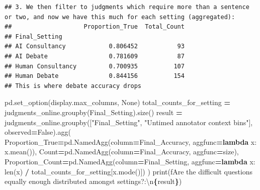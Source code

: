 \documentclass[
]{article}
\newenvironment{Shaded}{\begin{snugshade}}{\end{snugshade}}
\newcommand{\BuiltInTok}[1]{#1}
\newcommand{\CharTok}[1]{\textcolor[rgb]{0.31,0.60,0.02}{#1}}
\newcommand{\KeywordTok}[1]{\textcolor[rgb]{0.13,0.29,0.53}{\textbf{#1}}}
\newcommand{\NormalTok}[1]{#1}
\newcommand{\OperatorTok}[1]{\textcolor[rgb]{0.81,0.36,0.00}{\textbf{#1}}}
\newcommand{\SpecialCharTok}[1]{\textcolor[rgb]{0.81,0.36,0.00}{\textbf{#1}}}
\newcommand{\SpecialStringTok}[1]{\textcolor[rgb]{0.31,0.60,0.02}{#1}}
\newcommand{\StringTok}[1]{\textcolor[rgb]{0.31,0.60,0.02}{#1}}
\newcommand{\VariableTok}[1]{\textcolor[rgb]{0.00,0.00,0.00}{#1}}
\begin{document}
\begin{verbatim}
## 3. We then filter to judgments which require more than a sentence or two, and now we have this much for each setting (aggregated):
##                    Proportion_True  Total_Count
## Final_Setting                                  
## AI Consultancy            0.806452           93
## AI Debate                 0.781609           87
## Human Consultancy         0.700935          107
## Human Debate              0.844156          154
## This is where debate accuracy drops
\end{verbatim}

\begin{Shaded}
\begin{Highlighting}[]
\NormalTok{pd.set\_option(}\StringTok{\textquotesingle{}display.max\_columns\textquotesingle{}}\NormalTok{, }\VariableTok{None}\NormalTok{)}
\NormalTok{total\_counts\_for\_setting }\OperatorTok{=}\NormalTok{ judgments\_online.groupby(}\StringTok{\textquotesingle{}Final\_Setting\textquotesingle{}}\NormalTok{).size()}
\NormalTok{result }\OperatorTok{=}\NormalTok{ judgments\_online.groupby([}\StringTok{"Final\_Setting"}\NormalTok{, }\StringTok{"Untimed annotator context bins"}\NormalTok{], observed}\OperatorTok{=}\VariableTok{False}\NormalTok{).agg(}
\NormalTok{    Proportion\_True}\OperatorTok{=}\NormalTok{pd.NamedAgg(column}\OperatorTok{=}\StringTok{\textquotesingle{}Final\_Accuracy\textquotesingle{}}\NormalTok{, aggfunc}\OperatorTok{=}\KeywordTok{lambda}\NormalTok{ x: x.mean()),}
\NormalTok{    Count}\OperatorTok{=}\NormalTok{pd.NamedAgg(column}\OperatorTok{=}\StringTok{\textquotesingle{}Final\_Accuracy\textquotesingle{}}\NormalTok{, aggfunc}\OperatorTok{=}\StringTok{\textquotesingle{}size\textquotesingle{}}\NormalTok{),}
\NormalTok{    Proportion\_Count}\OperatorTok{=}\NormalTok{pd.NamedAgg(column}\OperatorTok{=}\StringTok{\textquotesingle{}Final\_Setting\textquotesingle{}}\NormalTok{, aggfunc}\OperatorTok{=}\KeywordTok{lambda}\NormalTok{ x: }\BuiltInTok{len}\NormalTok{(x) }\OperatorTok{/}\NormalTok{ total\_counts\_for\_setting[x.mode()])}
\NormalTok{)}
\BuiltInTok{print}\NormalTok{(}\SpecialStringTok{f\textquotesingle{}Are the difficult questions equally enough distributed amongst settings?:}\CharTok{\textbackslash{}n}\SpecialCharTok{\{}\NormalTok{result}\SpecialCharTok{\}}\SpecialStringTok{\textquotesingle{}}\NormalTok{)}
\end{Highlighting}
\end{Shaded}
\end{document}
